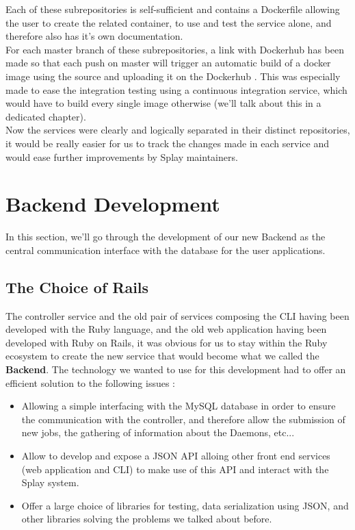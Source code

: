 \documentclass{eplmastersthesis}
\begin{document}
        Each of these subrepositories is self-sufficient and contains a Dockerfile
        allowing the user to create the related container, to use and test
        the service alone, and therefore also has it's own documentation.\\

        For each master branch of these subrepositories, a link with Dockerhub
        has been made so that each push on master will trigger an automatic build
        of a docker image using the source and uploading it on the Dockerhub
        \cite{DockerHubGithub}.
        This was especially made to ease the integration testing using a
        continuous integration service, which would have to build every single
        image otherwise (we'll talk about this in a dedicated chapter).\\

        Now the services were clearly and logically separated in their
        distinct repositories, it would be really easier for us to track
        the changes made in each service and would ease further improvements
        by Splay maintainers.

    \section{Backend Development}

      In this section, we'll go through the development of our new Backend
      as the central communication interface with the database for the user
      applications.\\

      \subsection{The Choice of Rails}

        The controller service and the old pair of services composing the CLI
        having been developed with the Ruby language, and the old web
        application having been developed with Ruby on Rails, it was obvious
        for us to stay within the Ruby ecosystem to create the new service
        that would become what we called the \textbf{Backend}. The technology
        we wanted to use for this development had to offer an efficient
        solution to the following issues :

        \begin{itemize}
          \item Allowing a simple interfacing with the MySQL database in order
          to ensure the communication with the controller, and therefore allow
          the submission of new jobs, the gathering of information about the
          Daemons, etc...
          \item Allow to develop and expose a JSON API alloing other front
          end services (web application and CLI) to make use of this API and
          interact with the Splay system.
          \item Offer a large choice of libraries for testing, data
          serialization using JSON, and other libraries solving the problems
          we talked about before.
        \end{itemize}
\end{document}
